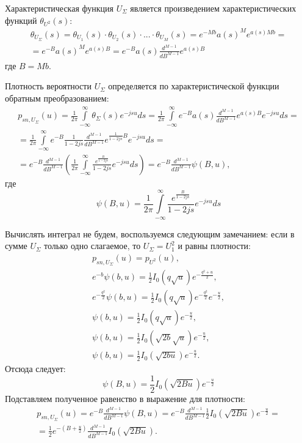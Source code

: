 \documentclass[a4paper,12pt]{article}
\newcommand{\md}[2]{ \frac{d^{#1}}{d #2^{#1}}}
\begin{document}
    Характеристическая функция $U_{\Sigma}$ является произведением характеристических функций $\theta_{U^2}(s)$:
    \begin{multline*}
        \theta_{U_{\Sigma}}(s)
        = \theta_{U_1}(s) \cdot \theta_{U_2}(s) \cdot ... \cdot \theta_{U_M}(s)
        = e^{- M b} a(s)^M e^{a(s) M b} = \\
        = e^{- B} a(s)^M e^{a(s) B}
        = e^{- B} a(s) \md{M-1}{B} e^{a(s) B}
    \end{multline*}
    где $B = M b$.

    Плотность вероятности $U_\Sigma$ определяется по характеристической функции обратным преобразованием:
    \begin{multline*}
        p_{sn,U_\Sigma}(u)
        = \frac{1}{2 \pi} \int \limits_{-\infty}^{\infty} \theta_\Sigma(s) e^{-j s u} ds
        = \frac{1}{2 \pi} \int \limits_{-\infty}^{\infty} e^{- B} a(s) \md{M-1}{B} e^{a(s) B} e^{-j s u} ds = \\
        = \frac{1}{2 \pi} \int \limits_{-\infty}^{\infty} e^{- B} \frac{1}{1 - 2 j s} \md{M-1}{B} e^{\frac{1}{1 - 2 j s} B} e^{-j s u} ds = \\
        = e^{- B} \md{M-1}{B} \left ( \frac{1}{2 \pi} \int \limits_{-\infty}^{\infty} \frac{e^{\frac{B}{1 - 2 j s}}}{1 - 2 j s}  e^{-j s u} ds \right )
        = e^{- B} \md{M-1}{B} \psi(B, u),
    \end{multline*}
    где
    \[
        \psi(B, u) = \frac{1}{2 \pi} \int \limits_{-\infty}^{\infty} \frac{e^{\frac{B}{1 - 2 j s}}}{1 - 2 j s}  e^{-j s u} ds
    \]

    Вычислять интеграл не будем, воспользуемся следующим замечанием: если в сумме $U_\Sigma$ только одно слагаемое, то $U_\Sigma = U_1^2$ и равны плотности:
    \begin{gather*}
        p_{sn,U_\Sigma}(u) = p_{U^2}(u) , \\
        e^{- b} \psi(b, u) = \frac{1}{2} I_0 \left ( q \sqrt{u} \right ) e^{- \frac{q^2 + u}{2}} , \\
        e^{- \frac{q^2}{2}} \psi(b, u) = \frac{1}{2} I_0 \left ( q \sqrt{u} \right ) e^{- \frac{q^2}{2}} e^{- \frac{u}{2}} , \\
        \psi(b, u) = \frac{1}{2} I_0 \left ( q \sqrt{u} \right ) e^{- \frac{u}{2}} , \\
        \psi(b, u) = \frac{1}{2} I_0 \left ( \sqrt{2 b} \sqrt{u} \right ) e^{- \frac{u}{2}} , \\
        \psi(b, u) = \frac{1}{2} I_0 \left ( \sqrt{2 b u} \right ) e^{- \frac{u}{2}} .
    \end{gather*}
    Отсюда следует:
    \[
        \psi(B, u) = \frac{1}{2} I_0 \left ( \sqrt{2 B u} \right ) e^{- \frac{u}{2}}
    \]
    Подставляем полученное равенство в выражение для плотности:
    \begin{multline*}
        p_{sn,U_\Sigma}(u)
        = e^{- B} \md{M-1}{B} \psi(B, u)
        = e^{- B} \md{M-1}{B} \frac{1}{2} I_0 \left ( \sqrt{2 B u} \right ) e^{- \frac{u}{2}} = \\
        = \frac{1}{2} e^{- \left ( B + \frac{u}{2} \right )} \md{M-1}{B} I_0 \left ( \sqrt{2 B u} \right ) .
    \end{multline*}
\end{document}
